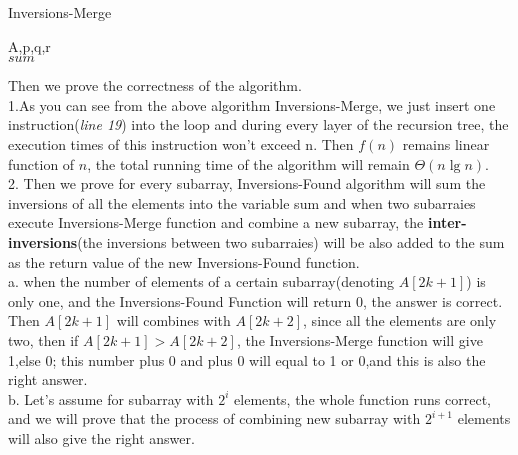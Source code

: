 \documentclass[oneside]{homework} %
\begin{document}
  \begin{algorithm}[htb,!tp]
  \caption{Inversions-Merge}
  \label{algo:invermerge}
  \begin{algorithmic}[1]
	\REQUIRE A,p,q,r
	\ENSURE ~ ~\\ 
	  \ENDFOR
	  \ENDFOR
	  \ELSE 
	  \ENDIF
	  \ENDFOR
	\LASTCON $sum$	
  \end{algorithmic}
  \end{algorithm}
  \newpage
	Then we prove the correctness of the algorithm.\\
	1.As you can see from the above algorithm Inversions-Merge, we just insert one instruction(\emph{line 19}) into the loop and during every layer of the recursion tree, the execution times of this instruction won't exceed n. Then $f(n)$ remains linear function of $n$, the total running time of the algorithm will remain $\Theta(n\lg{n})$.\\
	2. Then we prove for every subarray, Inversions-Found algorithm will sum the inversions of all the elements into the variable sum and when two subarraies execute Inversions-Merge function and combine a new subarray, the \textbf{inter-inversions}(the inversions between two subarraies) will be also added to the sum as the return value of the new Inversions-Found function.\\
	\indent a. when the number of elements of a certain subarray(denoting $A[2k+1]$) is only one, and the Inversions-Found Function will return 0, the answer is correct. Then $A[2k+1]$ will combines with $A[2k+2]$, since all the elements are only two, then if $A[2k+1]>A[2k+2]$, the Inversions-Merge function will give 1,else 0; this number plus 0 and plus 0 will equal to 1 or 0,and this is also the right answer.\\
	\indent b. Let's assume for subarray with $2^i$ elements, the whole function runs correct, and we will prove that the process of combining new subarray with $2^{i+1}$ elements will also give the right answer. \\ 
\end{document}
